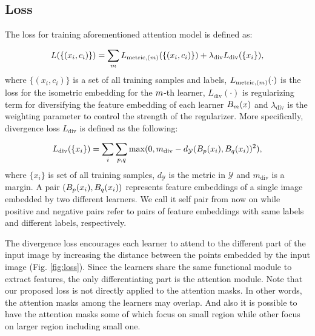 \documentclass[runningheads]{llncs}
\begin{document}
\vspace{-4mm}
\subsection{Loss}
\label{sec:loss}
\vspace{-2mm}

The loss for training aforementioned attention model is defined as:

\vspace{-2mm}
\begin{equation}
	L(\{(x_i,c_i)\}) = \sum_\ensemblesub L_{\mathrm{metric}, (\ensemblesub)}(\{(x_i,c_i)\}) + \lambda_{\mathrm{div}} L_{\mathrm{div}}(\{x_i\}),
\vspace{-1mm}
\label{eq:loss}
\end{equation}
where $\{(x_i,c_i)\}$ is a set of all training samples and labels, $L_{\mathrm{metric}, (m)}(\cdot)$ is the loss for the isometric embedding for the $m$-th learner, $L_{\mathrm{div}}(\cdot)$ is regularizing term for diversifying the feature embedding of each learner $B_m(x)$ and $\lambda_{\mathrm{div}}$ is the weighting parameter to control the strength of the regularizer. More specifically, divergence loss $L_{\mathrm{div}}$ is defined as the following:

\vspace{-2mm}
\begin{equation}
	L_{\mathrm{div}}(\{x_i\}) = \sum_i \sum_{p,q} \max(0, m_{\mathrm{div}} - d_{\mathcal{Y}}(\Ensemblefunc_p(x_i), \Ensemblefunc_q(x_i))^2) \vspace{-1mm}
\label{eq:div_loss},
\end{equation}
where $\{x_i\}$ is set of all training samples, $d_{\mathcal{Y}}$ is the metric in $\mathcal{Y}$ and $m_{\mathrm{div}}$ is a margin.
A pair $(B_p(x_i), B_q(x_i))$ represents feature embeddings of a single image embedded by two different learners.
We call it self pair from now on
while positive and negative pairs refer to pairs of feature embeddings with same labels and different labels, respectively.

The divergence loss encourages each learner to attend to the different part of the input image by increasing the distance between the points embedded by the input image (Fig. \ref{fig:loss}).
Since the learners share the same functional module to extract features, the only differentiating part is the attention module.
Note that our proposed loss is not directly applied to the attention masks.
In other words, the attention masks among the learners may overlap.
And also it is possible to have the attention masks some of which focus on small region while other focus on larger region including small one.
 
\end{document}
